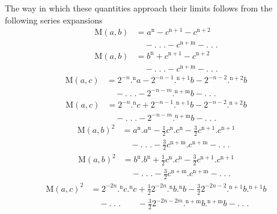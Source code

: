 \par The way in which these quantities approach their limits follows from the following series expansions
\[
\begin{aligned}\mathrm{M}(a,b)&=a^{\mathrm{n}}-c^{\mathrm{n}+1}-c^{\mathrm{n}+2}\\&\quad-.\;.\;.-c^{\mathrm{n}+\mathrm{m}}-.\;.\;.\end{aligned}
\]
\[
\begin{aligned}\mathrm{M}(a,b)&=b^{\mathrm{n}}+c^{\mathrm{n}+1}-c^{\mathrm{n}+2}\\&\quad-.\;.\;.-c^{\mathrm{n}+\mathrm{m}}-.\;.\;.\end{aligned}
\]
\[
\begin{aligned}\mathrm{M}(a,c)&=2^{-n}.{}^{\mathrm{n}}a-2^{-n-1}.{}^{\mathrm{n}+1}b-2^{-n-2}.{}^{\mathrm{n}+2}b\\&\quad-.\;.\;.-2^{-n-m}.{}^{\mathrm{n}+\mathrm{m}}b-.\;.\;.\end{aligned}
\]
\[
\begin{aligned}\mathrm{M}(a,c)&=2^{-n}.{}^{\mathrm{n}}c+2^{-n-1}.{}^{\mathrm{n}+1}b-2^{-n-2}.{}^{\mathrm{n}+2}b\\&\quad-.\;.\;.-2^{-n-m}.{}^{\mathrm{n}+\mathrm{m}}b-.\;.\;.\end{aligned}
\]
\[
\begin{aligned}\mathrm{M}(a,b)^2&=a^{\mathrm{n}}.a^{\mathrm{n}}-\frac12c^{\mathrm{n}}.c^{\mathrm{n}}-\frac32c^{\mathrm{n}+1}.c^{\mathrm{n}+1}\\&\quad-.\;.\;.-\frac32c^{\mathrm{n}+\mathrm{m}}.c^{\mathrm{n}+\mathrm{m}}-.\;.\;.\end{aligned}
\]
\[
\begin{aligned}\mathrm{M}(a,b)^2&=b^{\mathrm{n}}.b^{\mathrm{n}}+\frac12c^{\mathrm{n}}.c^{\mathrm{n}}-\frac32c^{\mathrm{n}+1}.c^{\mathrm{n}+1}\\&\quad-.\;.\;.-\frac32c^{\mathrm{n}+\mathrm{m}}.c^{\mathrm{n}+\mathrm{m}}-.\;.\;.\end{aligned}
\]
\[
\begin{aligned}\mathrm{M}(a,c)^2&=2^{-2n}.{}^{\mathrm{n}}c.{}^{\mathrm{n}}c+\frac12 2^{-2n}.{}^{\mathrm{n}}b.{}^{\mathrm{n}}b-\frac32 2^{-2n-2}.{}^{\mathrm{n}+1}b.{}^{\mathrm{n}+1}b\\&\quad-.\;.\;.\qquad-\frac32 2^{-2n-2m}.{}^{\mathrm{n}+\mathrm{m}}b.{}^{\mathrm{n}+\mathrm{m}}b-.\;.\;.\end{aligned}
\]
